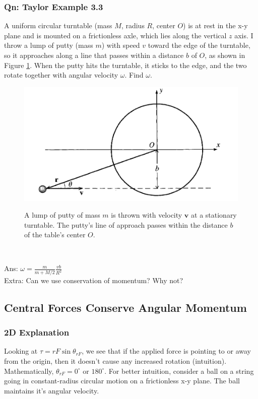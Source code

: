\documentclass{article}
\begin{document}
\subsubsection{Qn: Taylor Example 3.3}
A uniform circular turntable (mass $M$, radius $R$, center $O$) is at rest in the x-y plane and is mounted on a frictionless axle, which lies along the vertical $z$ axis. I throw a lump of putty (mass $m$) with speed $v$ toward the edge of the turntable, so it approaches along a line that passes within a distance $b$ of $O$, as shown in Figure \ref{fig:taylor3.3}. When the putty hits the turntable, it sticks to the edge, and the two rotate together with angular velocity $\omega$. Find $\omega$. \\
{
\begin{figure} 
\includegraphics[width=\linewidth]{images/taylor3.3.png}
\label{fig:taylor3.3}
\caption{A lump of putty of mass $m$ is thrown with velocity $\mathbf{v}$ at a stationary turntable. The putty's line of approach passes within the distance $b$ of the table's center $O$.}
\end{figure}\\[200pt]
}
\noindent Ans: $\omega = \frac{m}{m+M/2} \frac{vb}{R^2}$\\
\noindent Extra: Can we use conservation of momentum? Why not?
\subsection{Central Forces Conserve Angular Momentum}
\label{chap:centralforce}
\subsubsection{2D Explanation}
Looking at $\tau = rF \sin \theta_{rF}$, we see that if the applied force is pointing to or away from the origin, then it doesn't cause any increased rotation (intuition). Mathematically, $\theta_{rF}=0^\circ\text{ or } 180^\circ$. For better intuition, consider a ball on a string going in constant-radius circular motion on a frictionless x-y plane. The ball maintains it's angular velocity. 
\end{document}
